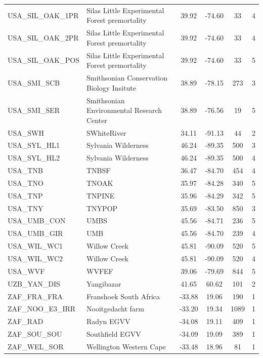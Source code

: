\documentclass[11pt,twoside]{reedthesis}
\begin{document}
\begin{longtable}[t]{l>{\centering\arraybackslash}p{12em}cccc}
USA\_SIL\_OAK\_1PR & Silas Little Experimental Forest premortality & 39.92 & -74.60 & 33 & 4\\
USA\_SIL\_OAK\_2PR & Silas Little Experimental Forest premortality & 39.92 & -74.60 & 33 & 4\\
USA\_SIL\_OAK\_POS & Silas Little Experimental Forest premortality & 39.92 & -74.60 & 33 & 5\\
USA\_SMI\_SCB & Smithsonian Conservation Biology Insitute & 38.89 & -78.15 & 273 & 3\\
USA\_SMI\_SER & Smithsonian Environmental Research Center & 38.89 & -76.56 & 19 & 5\\
USA\_SWH & SWhiteRiver & 34.11 & -91.13 & 44 & 2\\
USA\_SYL\_HL1 & Sylvania Wilderness & 46.24 & -89.35 & 500 & 3\\
USA\_SYL\_HL2 & Sylvania Wilderness & 46.24 & -89.35 & 500 & 4\\
USA\_TNB & TNBSF & 36.47 & -84.70 & 454 & 4\\
USA\_TNO & TNOAK & 35.97 & -84.28 & 340 & 5\\
USA\_TNP & TNPINE & 35.96 & -84.29 & 342 & 5\\
USA\_TNY & TNYPOP & 35.69 & -83.50 & 850 & 3\\
USA\_UMB\_CON & UMBS & 45.56 & -84.71 & 236 & 5\\
USA\_UMB\_GIR & UMB & 45.56 & -84.70 & 239 & 4\\
USA\_WIL\_WC1 & Willow Creek & 45.81 & -90.09 & 520 & 5\\
USA\_WIL\_WC2 & Willow Creek & 45.81 & -90.09 & 520 & 4\\
USA\_WVF & WVFEF & 39.06 & -79.69 & 844 & 5\\
UZB\_YAN\_DIS & Yangibazar & 41.65 & 60.62 & 101 & 2\\
ZAF\_FRA\_FRA & Franshoek South Africa & -33.88 & 19.06 & 190 & 1\\
ZAF\_NOO\_E3\_IRR & Nooitgedacht farm & -33.20 & 19.34 & 1089 & 1\\
ZAF\_RAD & Radyn EGVV & -34.08 & 19.11 & 409 & 1\\
ZAF\_SOU\_SOU & Southfield EGVV & -34.09 & 19.09 & 389 & 1\\
ZAF\_WEL\_SOR & Wellington Western Cape & -33.48 & 18.96 & 81 & 1\\*
\end{longtable}
\endgroup{} \newpage
\end{document}
